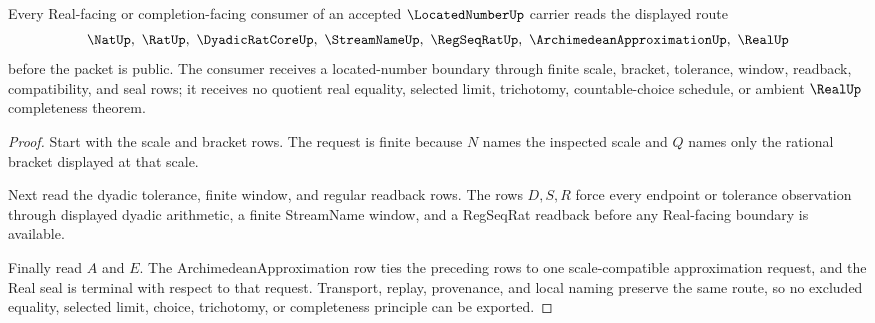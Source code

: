 \begin{theorem}
\label{thm:located-number-real-route}
Every Real-facing or completion-facing consumer of an accepted $\LocatedNumberUp$ carrier reads the displayed route
$$
\NatUp,\ \RatUp,\ \DyadicRatCoreUp,\ \StreamNameUp,\ \RegSeqRatUp,\ \ArchimedeanApproximationUp,\ \RealUp
$$
before the packet is public. The consumer receives a located-number boundary through finite scale, bracket, tolerance, window, readback, compatibility, and seal rows; it receives no quotient real equality, selected limit, trichotomy, countable-choice schedule, or ambient $\RealUp$ completeness theorem.
\end{theorem}
\begin{proof}
Start with the scale and bracket rows. The request is finite because $N$ names the inspected scale and $Q$ names only the rational bracket displayed at that scale.

Next read the dyadic tolerance, finite window, and regular readback rows. The rows $D,S,R$ force every endpoint or tolerance observation through displayed dyadic arithmetic, a finite StreamName window, and a RegSeqRat readback before any Real-facing boundary is available.

Finally read $A$ and $E$. The ArchimedeanApproximation row ties the preceding rows to one scale-compatible approximation request, and the Real seal is terminal with respect to that request. Transport, replay, provenance, and local naming preserve the same route, so no excluded equality, selected limit, choice, trichotomy, or completeness principle can be exported.
\end{proof}


\begin{closurestatus}{\LocatedNumberUp}
  \theoryclosure{\seedClosure}
  \formalstatus{\unformalizedV}
\end{closurestatus}
